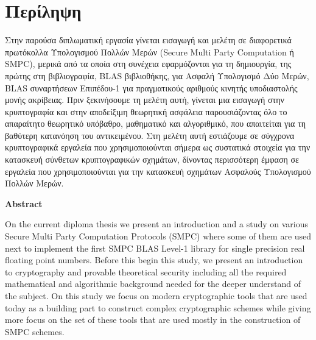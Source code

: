 \chapter*{Περίληψη}

\pagestyle{plain}

Στην παρούσα διπλωματική εργασία γίνεται εισαγωγή και μελέτη σε διαφορετικά πρωτόκολλα Υπολογισμού Πολλών Μερών (Secure Multi Party Computation ή SMPC), μερικά από τα οποία στη συνέχεια εφαρμόζονται για τη δημιουργία, της πρώτης στη βιβλιογραφία, BLAS βιβλιοθήκης, για Ασφαλή Υπολογισμό Δύο Μερών, BLAS συναρτήσεων Επιπέδου-1 για πραγματικούς αριθμούς κινητής υποδιαστολής μονής ακρίβειας. Πριν ξεκινήσουμε τη μελέτη αυτή, γίνεται μια εισαγωγή στην κρυπτογραφία και στην αποδείξιμη θεωρητική ασφάλεια παρουσιάζοντας όλο το απαραίτητο θεωρητικό υπόβαθρο, μαθηματικό και αλγοριθμικό, που απαιτείται για τη βαθύτερη κατανόηση του αντικειμένου. Στη μελέτη αυτή εστιάζουμε σε σύγχρονα κρυπτογραφικά εργαλεία που χρησιμοποιούνται σήμερα ως συστατικά στοιχεία για την κατασκευή σύνθετων κρυπτογραφικών σχημάτων, δίνοντας περισσότερη έμφαση σε εργαλεία που χρησιμοποιούνται για την κατασκευή σχημάτων Ασφαλούς Υπολογισμού Πολλών Μερών.

\vspace{0.3cm}

\begin{flushleft}
\huge\textbf{Abstract}
\end{flushleft}

On the current diploma thesis we present an introduction and a study on various Secure Multi Party Computation Protocols (SMPC) where some of them are used next to implement the first SMPC BLAS Level-1 library for single precision real floating point numbers. Before this begin this study, we present an introduction to cryptography and provable theoretical security including all the required mathematical and algorithmic background needed for the deeper understand of the subject. On this study we focus on modern cryptographic tools that are used today as a building part to construct complex cryptographic schemes while giving more focus on the set of these tools that are used mostly in the construction of SMPC schemes.